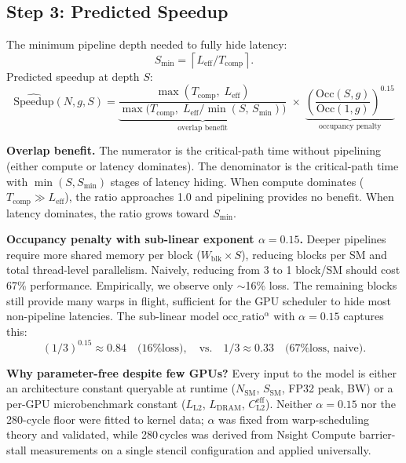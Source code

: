 \documentclass[sigplan,nonacm,10pt]{acmart}
\begin{document}
\subsection{Step 3: Predicted Speedup}

The minimum pipeline depth needed to fully hide latency:
\[
  S_{\min} = \left\lceil L_{\text{eff}} / T_{\text{comp}} \right\rceil.
\]
Predicted speedup at depth $S$:
\[
  \boxed{
  \widehat{\text{Speedup}}(N, g, S) =
  \underbrace{\frac{\max(T_{\text{comp}},\; L_{\text{eff}})}
              {\max\!\bigl(T_{\text{comp}},\; L_{\text{eff}} /
               \min(S,\, S_{\min})\bigr)}}_{\text{overlap benefit}}
  \;\times\;
  \underbrace{\left(\frac{\text{Occ}(S,g)}{\text{Occ}(1,g)}\right)^{0.15}}_{\text{occupancy penalty}}
  }
\]

\textbf{Overlap benefit.}
The numerator is the critical-path time without pipelining (either
compute or latency dominates).
The denominator is the critical-path time with $\min(S, S_{\min})$
stages of latency hiding.
When compute dominates ($T_{\text{comp}} \gg L_{\text{eff}}$), the ratio
approaches 1.0 and pipelining provides no benefit.
When latency dominates, the ratio grows toward $S_{\min}$.

\textbf{Occupancy penalty with sub-linear exponent $\alpha = 0.15$.}
Deeper pipelines require more shared memory per block
($W_{\text{blk}} \times S$), reducing blocks per SM and total thread-level
parallelism.
Naively, reducing from 3 to 1 block/SM should cost 67\% performance.
Empirically, we observe only $\sim$16\% loss.
The remaining blocks still provide many warps in flight, sufficient for
the GPU scheduler to hide most non-pipeline latencies.
The sub-linear model $\text{occ\_ratio}^\alpha$ with $\alpha = 0.15$
captures this:
\[
  (1/3)^{0.15} \approx 0.84 \quad\text{(16\% loss)},
  \quad\text{vs.}\quad
  1/3 \approx 0.33 \quad\text{(67\% loss, naive)}.
\]

\textbf{Why parameter-free despite few GPUs?}
Every input to the model is either an architecture constant queryable at
runtime ($N_{\text{SM}}$, $S_{\text{SM}}$, FP32 peak, BW) or a
per-GPU microbenchmark constant ($L_{\text{L2}}$, $L_{\text{DRAM}}$,
$C_{\text{L2}}^{\text{eff}}$).
Neither $\alpha = 0.15$ nor the 280-cycle floor were fitted to kernel
data; $\alpha$ was fixed from warp-scheduling theory and validated, while
280\,cycles was derived from Nsight Compute barrier-stall measurements on
a single stencil configuration and applied universally.

\end{document}
